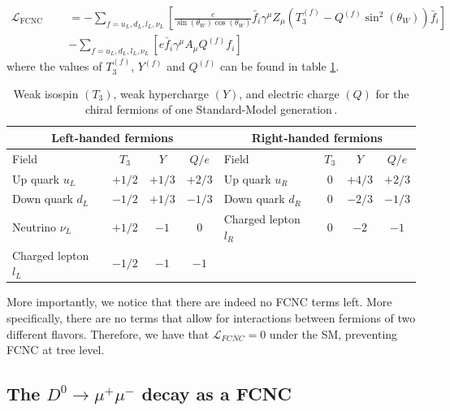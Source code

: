 \begin{equation}
\begin{split}
\mathcal{L}_{\text{FCNC Candidates}} &= -\sum_{f = u_{L},d_{L},l_{L}, \nu_{L}} \left[\frac{e}{\sin(\theta_{W})\cos(\theta_{W})} \bar{f}_{i}\gamma^\mu Z_{\mu}\left(T_{3}^{(f)} -Q^{(f)}\sin^2(\theta_{W})\right)\bar{f}_{i}\right]\\
&- \sum_{f = u_{L},d_{L},l_{L}, \nu_{L}} \left[ e \bar{f}_{i}\gamma^\mu A_{\mu}Q^{(f)}f_{i}\right]
\end{split}
\end{equation}
where the values of $T_3^{(f)}$, $Y^{(f)}$ and $Q^{(f)}$ can be found in table \ref{tab:ew_charges}. 


\begin{table}[htbp]
    \centering
    \begin{tabular}{|lccc|lccc|}
      \hline
      \multicolumn{4}{|c|}{\textbf{Left‑handed fermions}} &
      \multicolumn{4}{c|}{\textbf{Right‑handed fermions}} \\
      \hline
      Field & $T_3$ & $Y$ & $Q/e$ &
      Field & $T_3$ & $Y$ & $Q/e$ \\
      \hline
      Up quark $u_L$        & $+1/2$ & $+1/3$ & $+2/3$ &
      Up quark $u_R$        & $0$    & $+4/3$ & $+2/3$ \\
      Down quark $d_L$      & $-1/2$ & $+1/3$ & $-1/3$ &
      Down quark $d_R$      & $0$    & $-2/3$ & $-1/3$ \\
      Neutrino $\nu_L$      & $+1/2$ & $-1$   & $0$    &
      Charged lepton $l_R$  & $0$    & $-2$   & $-1$   \\
      Charged lepton $l_L$  & $-1/2$ & $-1$   & $-1$   &
                            &        &        &        \\
      \hline
    \end{tabular}
    \caption{Weak isospin $(T_3)$, weak hypercharge $(Y)$, and electric
             charge $(Q)$ for the chiral fermions of one Standard‑Model
             generation\,\cite{ref:pdg2024}.}
    \label{tab:ew_charges}
  \end{table}
  
  

More importantly, we notice that there are indeed no FCNC terms left. More specifically, there are no terms that allow for interactions between fermions of two different flavors. Therefore, we have that $\mathcal{L}_{FCNC} = 0$ under the SM, preventing FCNC at tree level. 

\subsection{The $D^0 \to \mu^+ \mu^-$ decay as a FCNC}

